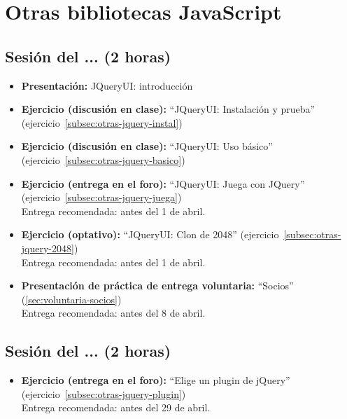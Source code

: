 \documentclass[a4paper,12pt]{report}
\begin{document}
\section{Otras bibliotecas JavaScript}

\subsection{Sesión del ... (2 horas)}

\begin{itemize}
\item \textbf{Presentación:} JQueryUI: introducción
\item \textbf{Ejercicio (discusión en clase):} ``JQueryUI: Instalación y prueba'' (ejercicio~\ref{subsec:otras-jquery-instal})
\item \textbf{Ejercicio (discusión en clase):} ``JQueryUI: Uso básico'' (ejercicio~\ref{subsec:otras-jquery-basico}) \\
\item \textbf{Ejercicio (entrega en el foro):} ``JQueryUI: Juega con JQuery'' (ejercicio~\ref{subsec:otras-jquery-juega}) \\
  Entrega recomendada: antes del 1 de abril.
\item \textbf{Ejercicio (optativo):} ``JQueryUI: Clon de 2048'' (ejercicio~\ref{subsec:otras-jquery-2048}) \\
  Entrega recomendada: antes del 1 de abril.
\item \textbf{Presentación de práctica de entrega voluntaria:} ``Socios'' (\ref{sec:voluntaria-socios}) \\
  Entrega recomendada: antes del 8 de abril.
\end{itemize}

\subsection{Sesión del ... (2 horas)}

\begin{itemize}
\item \textbf{Ejercicio (entrega en el foro):} ``Elige un plugin de jQuery'' (ejercicio~\ref{subsec:otras-jquery-plugin}) \\
  Entrega recomendada: antes del 29 de abril.
\end{itemize}
\end{document}
